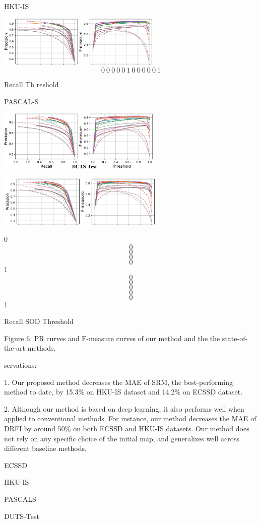 \documentclass[a4paper,10pt]{article}
\begin{document}
HKU-IS
\begin{center}
\includegraphics[width=77.89mm,height=24.55mm]{./zengyu_images/image013.eps}
$$
0\ 0\ 0\ 0\ 0\ 1\ 0\ 0\ 0\ 0\ 0\ 1
$$
\end{center}
Recall Th reshold

PASCAL-S
\begin{center}
\includegraphics[width=78.23mm,height=29.13mm]{./zengyu_images/image014.eps}

\includegraphics[width=79.93mm,height=24.60mm]{./zengyu_images/image015.eps}
\end{center}
$0$
$$
0
$$
$$
0
$$
$$
0
$$
$$
0
$$
1
$$
0
$$
$$
0
$$
$$
0
$$
$$
0
$$
$$
0
$$
1

Recall SOD Threshold

Figure 6. PR curves and $\mathrm{F}$-measure curves of our method and the the state-of-the-art methods.

servations:

1. Our proposed method decreases the MAE of SRM, the best-performing method to date, by 15.3\% on HKU-IS dataset and 14.2\% on ECSSD dataset.

2. Although our method is based on deep learning, it also performs well when applied to conventional methods. For instance, our method decreases the MAE of DRFI by around 50\% on both ECSSD and HKU-IS datasets. Our method does not rely on any specific choice of the initial map, and generalizes well across different baseline methods.

ECSSD

HKU-IS

PASCALS

DUTS-Test
\end{document}

